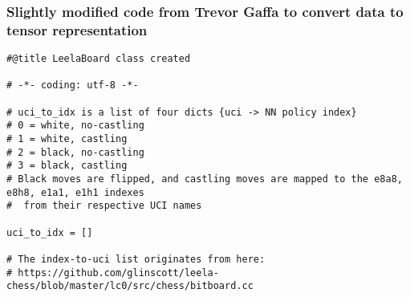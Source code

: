 \subsubsection{Slightly modified code from Trevor Gaffa to convert data to tensor representation}
\begin{verbatim}
#@title LeelaBoard class created

# -*- coding: utf-8 -*-

# uci_to_idx is a list of four dicts {uci -> NN policy index}
# 0 = white, no-castling
# 1 = white, castling
# 2 = black, no-castling
# 3 = black, castling
# Black moves are flipped, and castling moves are mapped to the e8a8, e8h8, e1a1, e1h1 indexes
#  from their respective UCI names

uci_to_idx = []

# The index-to-uci list originates from here:
# https://github.com/glinscott/leela-chess/blob/master/lc0/src/chess/bitboard.cc


\end{verbatim}
